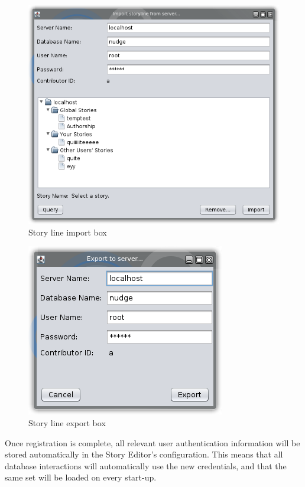 \documentclass[12pt,letterpaper]{article}
\begin{document}
\begin{figure}
    \begin{center}
        \includegraphics[scale=1]{importwindow.png}
    \end{center}
    \caption{Story line import box}
\end{figure}

\begin{figure}
    \begin{center}
        \includegraphics[scale=1]{exportwindow.png}
    \end{center}
    \caption{Story line export box}
\end{figure}

Once registration is complete, all relevant user authentication information will be stored automatically in the Story Editor's
configuration. This means that all database interactions will automatically use the new credentials, and that the same 
set will be loaded on every start-up.\footnotemark
\end{document}
